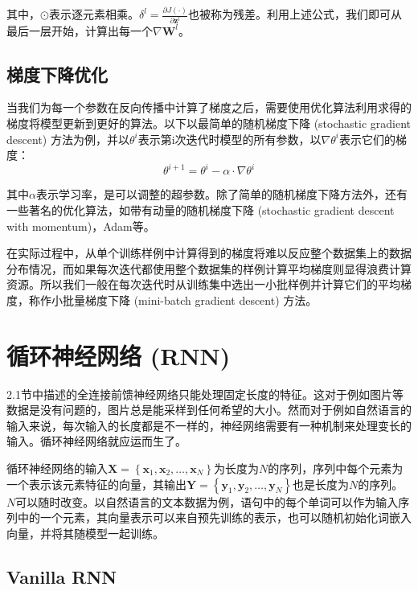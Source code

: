 其中，$\odot$表示逐元素相乘。$\delta^l=\frac{\partial J\left(\cdot\right)}{\partial\bm{z}^l}$也被称为残差。利用上述公式，我们即可从最后一层开始，计算出每一个$\nabla\bm{W}^l$。

\subsection{梯度下降优化}

当我们为每一个参数在反向传播中计算了梯度之后，需要使用优化算法利用求得的梯度将模型更新到更好的算法。以下以最简单的随机梯度下降 (stochastic gradient descent) 方法为例，并以$\theta^i$表示第i次迭代时模型的所有参数，以$\nabla\theta^i$表示它们的梯度：
\begin{equation}
    \theta^{i+1}=\theta^i-\alpha\cdot\nabla\theta^i
\end{equation}

其中$\alpha$表示学习率，是可以调整的超参数。除了简单的随机梯度下降方法外，还有一些著名的优化算法，如带有动量的随机梯度下降 (stochastic gradient descent with momentum)，Adam\cite{Adam14}等。

在实际过程中，从单个训练样例中计算得到的梯度将难以反应整个数据集上的数据分布情况，而如果每次迭代都使用整个数据集的样例计算平均梯度则显得浪费计算资源。所以我们一般在每次迭代时从训练集中选出一小批样例并计算它们的平均梯度，称作小批量梯度下降 (mini-batch gradient descent) 方法。

\section{循环神经网络 (RNN)}

2.1节中描述的全连接前馈神经网络只能处理固定长度的特征。这对于例如图片等数据是没有问题的，图片总是能采样到任何希望的大小。然而对于例如自然语言的输入来说，每次输入的长度都是不一样的，神经网络需要有一种机制来处理变长的输入。循环神经网络就应运而生了。

循环神经网络的输入$\bm{X}=\left\{\bm{x}_1,\bm{x}_2,\ldots,\bm{x}_N\right\}$为长度为$N$的序列，序列中每个元素为一个表示该元素特征的向量，其输出$\bm{Y}=\left\{\bm{y}_1,\bm{y}_2,\ldots,\bm{y}_N\right\}$也是长度为$N$的序列。$N$可以随时改变。以自然语言的文本数据为例，语句中的每个单词可以作为输入序列中的一个元素，其向量表示可以来自预先训练的表示，也可以随机初始化词嵌入向量，并将其随模型一起训练。

\subsection{Vanilla RNN}

